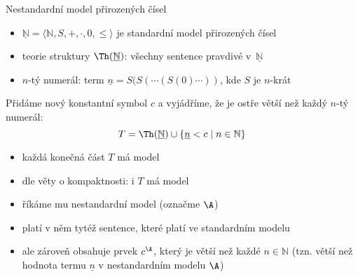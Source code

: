 \documentclass{beamer}
\begin{document}
\begin{frame}{Nestandardní model přirozených čísel}

    \pause
    \begin{itemize}
        \item $\underline{\mathbb N}=\langle\mathbb N,S,+,\cdot,0,\leq\rangle$ je \alert{standardní model} přirozených čísel\pause
        \item \alert{teorie struktury $\Th(\underline{\mathbb N})$:} všechny sentence \alert{pravdivé} v~$\underline{\mathbb N}$\pause
        \item \alert{$n$-tý numerál:} term $\underline n=S(S(\cdots (S(0)\cdots))$, kde $S$ je $n$-krát
    \end{itemize}
    
    \pause
    Přidáme nový konstantní symbol $c$ a vyjádříme, že je ostře větší než každý $n$-tý numerál:
    $$
    T=\Th(\underline{\mathbb N})\cup\{\underline n<c\mid n\in \mathbb N\}
    $$
        
    \pause
    \begin{itemize}
        \item každá konečná část $T$ má model\pause
        \item dle věty o kompaktnosti: i $T$ má model\pause
        \item říkáme mu \alert{nestandardní model} (označme $\A$)\pause
        \item platí v něm tytéž sentence, které platí ve standardním modelu\pause
        \item ale zároveň obsahuje prvek $c^\A$, který je větší než každé $n\in \mathbb N$ (tzn. větší než hodnota termu $\underline n$ v nestandardním modelu $\A$)
    \end{itemize}    

\end{frame}




\end{document}

